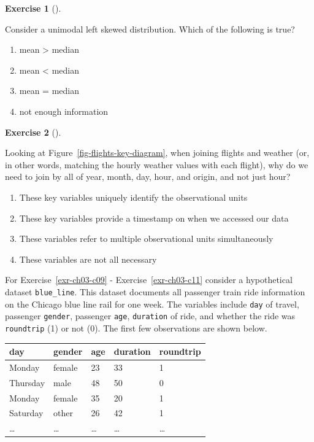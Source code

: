 \documentclass[
  letterpaper,
  DIV=11,
  numbers=noendperiod]{scrreprt}
\providecommand{\tightlist}{%
  \setlength{\itemsep}{0pt}\setlength{\parskip}{0pt}}\usepackage{longtable,booktabs,array}
\theoremstyle{definition}
\newtheorem{exercise}{Exercise}[chapter]
\theoremstyle{remark}
\begin{document}
\leavevmode{}%
\begin{exercise}[]\label{exr-ch03-c07}

Consider a unimodal left skewed distribution. Which of the following is
true?

\begin{enumerate}
\def\labelenumi{\alph{enumi})}
\tightlist
\item
  mean \textgreater{} median
\item
  mean \textless{} median
\item
  mean = median
\item
  not enough information
\end{enumerate}

\end{exercise}

\leavevmode{}%
\begin{exercise}[]\label{exr-ch03-c08}

Looking at Figure~\ref{fig-flights-key-diagram}, when joining flights
and weather (or, in other words, matching the hourly weather values with
each flight), why do we need to join by all of year, month, day, hour,
and origin, and not just hour?

\begin{enumerate}
\def\labelenumi{\alph{enumi})}
\tightlist
\item
  These key variables uniquely identify the observational units
\item
  These key variables provide a timestamp on when we accessed our data
\item
  These variables refer to multiple observational units simultaneously
\item
  These variables are not all necessary
\end{enumerate}

\end{exercise}

For Exercise~\ref{exr-ch03-c09} - Exercise~\ref{exr-ch03-c11} consider a
hypothetical dataset \texttt{blue\_line}. This dataset documents all
passenger train ride information on the Chicago blue line rail for one
week. The variables include \texttt{day} of travel, passenger
\texttt{gender}, passenger \texttt{age}, \texttt{duration} of ride, and
whether the ride was \texttt{roundtrip} (1) or not (0). The first few
observations are shown below.

\begin{longtable}[]{@{}lllll@{}}
\toprule()
day & gender & age & duration & roundtrip \\
\midrule()
\endhead
Monday & female & 23 & 33 & 1 \\
Thursday & male & 48 & 50 & 0 \\
Monday & female & 35 & 20 & 1 \\
Saturday & other & 26 & 42 & 1 \\
\ldots{} & \ldots{} & \ldots{} & \ldots{} & \ldots{} \\
\bottomrule()
\end{longtable}
\end{document}
